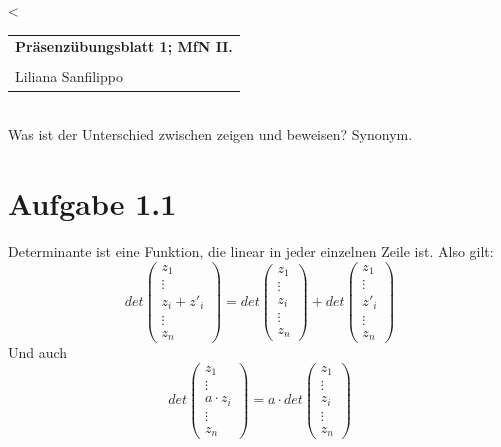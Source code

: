 \documentclass{article} %
\newcommand{\titulo}{Präsenzübungsblatt 1; MfN II.}
\newcommand{\nombre}{Liliana Sanfilippo}
\begin{document}
<

\begin{tabular}{p{12cm}}
{{\Large\bf\titulo}}\\
\vspace{0.2cm}\\
 {\large\nombre}\\
\end{tabular} 
\vspace{0.2cm}\\

Was ist der Unterschied zwischen zeigen und beweisen? Synonym. 
\section{Aufgabe 1.1}
Determinante ist eine Funktion, die linear in jeder einzelnen Zeile ist. Also gilt: 
\begin{equation} \label{eq:zeilenaddition}
    det \begin{pmatrix}
        z_1 \\ \vdots \\ z_i + z'_i \\ \vdots \\ z_n 
    \end{pmatrix} = det \begin{pmatrix}
        z_1 \\ \vdots \\ z_i \\ \vdots \\ z_n 
    \end{pmatrix} + det \begin{pmatrix}
        z_1 \\ \vdots \\  z'_i \\ \vdots \\ z_n 
    \end{pmatrix}
\end{equation}
Und auch 
\begin{equation} \label{eq:skalar}
    det \begin{pmatrix}
        z_1 \\ \vdots \\ a \cdot z_i  \\ \vdots \\ z_n 
    \end{pmatrix} =  a \cdot det \begin{pmatrix}
        z_1 \\ \vdots \\  z_i  \\ \vdots \\ z_n 
    \end{pmatrix} 
\end{equation}
\end{document}
